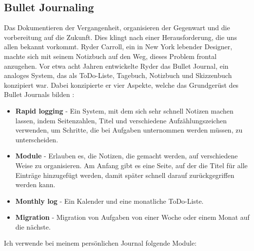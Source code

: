 \subsection{Bullet Journaling}
\authortoc{\jonas}{\subsectionident}
\label{bulletjournaling}
Das Dokumentieren der Vergangenheit, organisieren der Gegenwart und die vorbereitung auf die Zukunft.
\newline
Dies klingt nach einer Herausforderung, die uns allen bekannt vorkommt.
\newline
Ryder Carroll, ein in New York lebender Designer, machte sich mit seinem Notizbuch auf den Weg, dieses Problem frontal anzugehen. Vor etwa acht Jahren entwickelte Ryder das Bullet Journal, ein analoges System, das als ToDo-Liste, Tagebuch, Notizbuch und Skizzenbuch konzipiert war. Dabei konzipierte er vier Aspekte, welche das Grundgerüst des Bullet Journals bilden \cite{bulletjournal_2020} :
\begin{itemize}
  \item \textbf{Rapid logging} - Ein System, mit dem sich sehr schnell Notizen machen lassen, indem Seitenzahlen, Titel und verschiedene Aufzählungszeichen verwenden, um Schritte, die bei Aufgaben unternommen werden müssen, zu unterscheiden.
  \item \textbf{Module} - Erlauben es, die Notizen, die gemacht werden, auf verschiedene Weise zu organisieren. Am Anfang gibt es eine Seite, auf der die Titel für alle Einträge hinzugefügt werden, damit später schnell darauf zurückgegriffen werden kann.
  \item \textbf{Monthly log} - Ein Kalender und eine monatliche ToDo-Liste.
  \item \textbf{Migration} - Migration von Aufgaben von einer Woche oder einem Monat auf die nächste.
\end{itemize}
Ich verwende bei meinem persönlichen Journal folgende Module:
